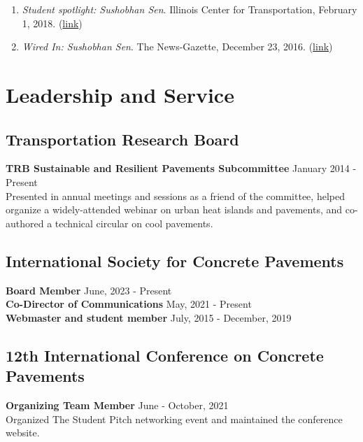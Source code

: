 \documentclass[12pt]{article}
\begin{document}
\begin{enumerate}
	\item \textit{Student spotlight: Sushobhan Sen}. Illinois Center for Transportation, February 1, 2018. (\href{https://ict.illinois.edu/news/newsletters/more-newsletters/february-2018/student-spotlight-sushobhan-sen}{link})
	\item \textit{Wired In: Sushobhan Sen}. The News-Gazette, December 23, 2016. (\href{https://www.news-gazette.com/multimedia/video/wired-in-sushobhan-sen/article_52527b7b-4b7f-5642-88c8-bf4bb2fd5e2f.html}{link})
\end{enumerate}

\bigskip
\section*{Leadership and Service} 
\hfill
\subsection*{Transportation Research Board}
\textbf{TRB Sustainable and Resilient Pavements Subcommittee} \hfill January 2014 - Present \\
Presented in annual meetings and sessions as a friend of the committee, helped organize a widely-attended webinar on urban heat islands and pavements, and co-authored a technical circular on cool pavements. \\

\subsection*{International Society for Concrete Pavements}
\textbf{Board Member} \hfill June, 2023 - Present \\
\textbf{Co-Director of Communications} \hfill May, 2021 - Present \\
\textbf{Webmaster and student member} \hfill July, 2015 - December, 2019 \\

\subsection*{12th International Conference on Concrete Pavements}
\textbf{Organizing Team Member} \hfill June - October, 2021 \\
Organized The Student Pitch networking event and maintained the conference website. \\
\end{document}
